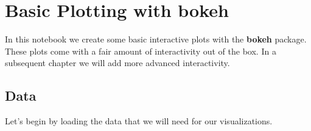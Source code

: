 \documentclass[
  letterpaper,
  DIV=11,
  numbers=noendperiod]{scrreprt}
\begin{document}
\hypertarget{basic-plotting-with-bokeh}{%
\chapter{\texorpdfstring{Basic Plotting with
\textbf{bokeh}}{Basic Plotting with bokeh}}\label{basic-plotting-with-bokeh}}

In this notebook we create some basic interactive plots with the
\textbf{bokeh} package. These plots come with a fair amount of
interactivity out of the box. In a subsequent chapter we will add more
advanced interactivity.

\hypertarget{data}{%
\section{Data}\label{data}}

Let's begin by loading the data that we will need for our
visualizations.
\end{document}
